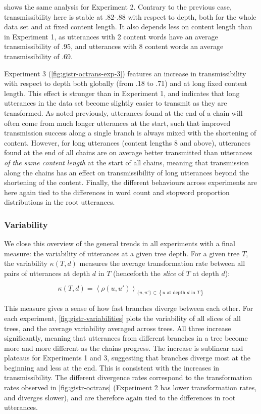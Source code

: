  shows the same analysis for Experiment 2.
Contrary to the previous case, transmissibility here is stable at
.82-.88 with respect to depth, both for the whole data set and at fixed
content length. It also depends less on content length than in
Experiment 1, as utterances with 2 content words have an average
transmissibility of .95, and utterances with 8 content words an average
transmissibility of .69.

Experiment 3 (\cref{fig:gistr-octrans-exp-3}) features an increase in
transmissibility with respect to depth both globally (from .18 to .71)
and at long fixed content length. This effect is stronger than in
Experiment 1, and indicates that long utterances in the data set become
slightly easier to transmit as they are transformed. As noted
previously, utterances found at the end of a chain will often come from
much longer utterances at the start, such that improved transmission
success along a single branch is always mixed with the shortening of
content. However, for long utterances (content lengths 8 and above),
utterances found at the end of all chains are on average better
transmitted than utterances \emph{of the same content length} at the
start of all chains, meaning that transmission along the chains has an
effect on transmissibility of long utterances beyond the shortening of
the content. Finally, the different behaviours across experiments are
here again tied to the differences in word count and stopword proportion
distributions in the root utterances.

\subsubsection{Variability}\label{variability}

We close this overview of the general trends in all experiments with a
final measure: the variability of utterances at a given tree depth. For
a given tree \(T\), the variability \(\kappa(T, d)\) measures the
average transformation rate between all pairs of utterances at depth
\(d\) in \(T\) (henceforth the \emph{slice} of \(T\) at depth \(d\)):

\[\kappa(T, d) = \left< \rho(u, u') \right>_{\{u, u'\} \subset \left\{ \text{$u$ at depth $d$ in $T$}\right\} }\]

This measure gives a sense of how fast branches diverge between each
other. For each experiment, \cref{fig:gistr-variabilities} plots the
variability of all slices of all trees, and the average variability
averaged across trees. All three increase significantly, meaning that
utterances from different branches in a tree become more and more
different as the chains progress. The increase is sublinear and plateaus
for Experiments 1 and 3, suggesting that branches diverge most at the
beginning and less at the end. This is consistent with the increases in
transmissibility. The different divergence rates correspond to the
transformation rates observed in \cref{fig:gistr-octrans} (Experiment 2
has lower transformation rates, and diverges slower), and are therefore
again tied to the differences in root utterances.

